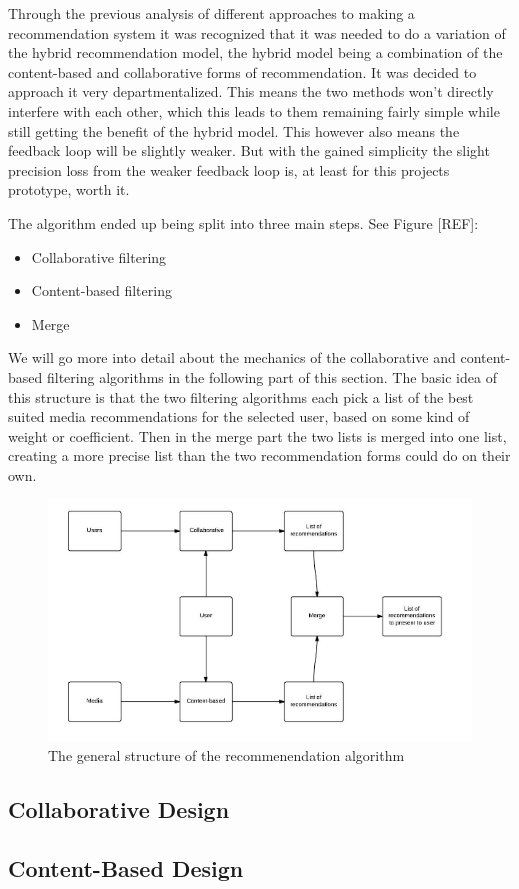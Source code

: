 Through the previous analysis of different approaches to making a recommendation system it was recognized that it was needed to do a variation of the hybrid recommendation model, the hybrid model being a combination of the content-based and collaborative forms of recommendation. It was decided to approach it very departmentalized. This means the two methods won’t directly interfere with each other, which this leads to them remaining fairly simple while still getting the benefit of the hybrid model. This however also means the feedback loop will be slightly weaker. But with the gained simplicity the slight precision loss from the weaker feedback loop is, at least for this projects prototype, worth it.

The algorithm ended up being split into three main steps. See Figure [REF]:
\begin{itemize}
	\item Collaborative filtering
	\item Content-based filtering
	\item Merge
\end{itemize}

We will go more into detail about the mechanics of the collaborative and content-based filtering algorithms in the following part of this section. The basic idea of this structure is that the two filtering algorithms each pick a list of the best suited media recommendations for the selected user, based on some kind of weight or coefficient. Then in the merge part the two lists is merged into one list, creating a more precise list than the two recommendation forms could do on their own.

\begin{figure}[htb]
\centering
\includegraphics[width=1\textwidth]{Images/RecommendationAlgo.png}
\caption{The general structure of the recommenendation algorithm}
\label{GenRecAlgo}
\end{figure}

\subsection{Collaborative Design}
\label{CollaborativeDes}

\subsection{Content-Based Design}
\label{ContentBasedDes}
